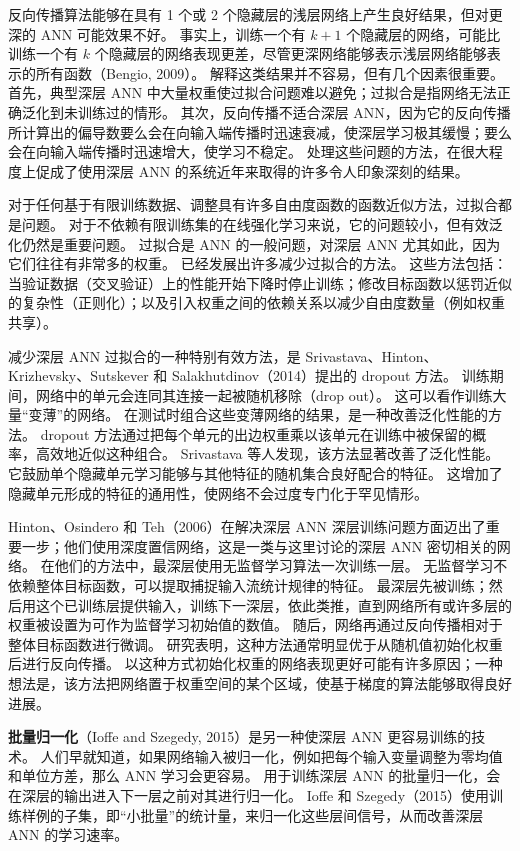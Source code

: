 \documentclass[UTF8, 12pt, fontset=fandol, oneside]{ctexart}
\begin{document}
反向传播算法能够在具有 1 个或 2 个隐藏层的浅层网络上产生良好结果，但对更深的 ANN 可能效果不好。
事实上，训练一个有 $k+1$ 个隐藏层的网络，可能比训练一个有 $k$ 个隐藏层的网络表现更差，尽管更深网络能够表示浅层网络能够表示的所有函数（Bengio, 2009）。
解释这类结果并不容易，但有几个因素很重要。
首先，典型深层 ANN 中大量权重使过拟合问题难以避免；过拟合是指网络无法正确泛化到未训练过的情形。
其次，反向传播不适合深层 ANN，因为它的反向传播所计算出的偏导数要么会在向输入端传播时迅速衰减，使深层学习极其缓慢；要么会在向输入端传播时迅速增大，使学习不稳定。
处理这些问题的方法，在很大程度上促成了使用深层 ANN 的系统近年来取得的许多令人印象深刻的结果。

对于任何基于有限训练数据、调整具有许多自由度函数的函数近似方法，过拟合都是问题。
对于不依赖有限训练集的在线强化学习来说，它的问题较小，但有效泛化仍然是重要问题。
过拟合是 ANN 的一般问题，对深层 ANN 尤其如此，因为它们往往有非常多的权重。
已经发展出许多减少过拟合的方法。
这些方法包括：当验证数据（交叉验证）上的性能开始下降时停止训练；修改目标函数以惩罚近似的复杂性（正则化）；以及引入权重之间的依赖关系以减少自由度数量（例如权重共享）。

减少深层 ANN 过拟合的一种特别有效方法，是 Srivastava、Hinton、Krizhevsky、Sutskever 和 Salakhutdinov（2014）提出的 dropout 方法。
训练期间，网络中的单元会连同其连接一起被随机移除（drop out）。
这可以看作训练大量“变薄”的网络。
在测试时组合这些变薄网络的结果，是一种改善泛化性能的方法。
dropout 方法通过把每个单元的出边权重乘以该单元在训练中被保留的概率，高效地近似这种组合。
Srivastava 等人发现，该方法显著改善了泛化性能。
它鼓励单个隐藏单元学习能够与其他特征的随机集合良好配合的特征。
这增加了隐藏单元形成的特征的通用性，使网络不会过度专门化于罕见情形。

Hinton、Osindero 和 Teh（2006）在解决深层 ANN 深层训练问题方面迈出了重要一步；他们使用深度置信网络，这是一类与这里讨论的深层 ANN 密切相关的网络。
在他们的方法中，最深层使用无监督学习算法一次训练一层。
无监督学习不依赖整体目标函数，可以提取捕捉输入流统计规律的特征。
最深层先被训练；然后用这个已训练层提供输入，训练下一深层，依此类推，直到网络所有或许多层的权重被设置为可作为监督学习初始值的数值。
随后，网络再通过反向传播相对于整体目标函数进行微调。
研究表明，这种方法通常明显优于从随机值初始化权重后进行反向传播。
以这种方式初始化权重的网络表现更好可能有许多原因；一种想法是，该方法把网络置于权重空间的某个区域，使基于梯度的算法能够取得良好进展。

\textbf{批量归一化}（Ioffe and Szegedy, 2015）是另一种使深层 ANN 更容易训练的技术。
人们早就知道，如果网络输入被归一化，例如把每个输入变量调整为零均值和单位方差，那么 ANN 学习会更容易。
用于训练深层 ANN 的批量归一化，会在深层的输出进入下一层之前对其进行归一化。
Ioffe 和 Szegedy（2015）使用训练样例的子集，即“小批量”的统计量，来归一化这些层间信号，从而改善深层 ANN 的学习速率。
\end{document}
